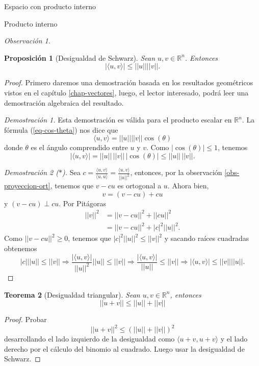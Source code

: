 \documentclass[a4paper,12pt,twoside,spanish,reqno]{amsbook}
\newtheorem{teorema}{Teorema}[section]
\newtheorem{proposicion}[teorema]{Proposici\'on}
\theoremstyle{definition}
\theoremstyle{remark}
\newtheorem{observacion}{Observaci\'on}[section]
\newcommand{\la}{\langle}
\newcommand{\ra}{\rangle}
\newcommand{\R}{\mathbb R}
\begin{document}
\begin{chapter}{Espacio con producto interno}
\begin{section}{Producto interno}
\begin{observacion}
		\end{observacion}
		
		\begin{proposicion}[Desigualdad de Schwarz] Sean $u, v\in \R^n$. Entonces 
			$$|\la u, v \ra| \le ||u||||v||.$$
		\end{proposicion}
		\begin{proof} Primero daremos una demostración basada en los resultados geométricos vistos en el capítulo \ref{chap-vectores}, luego,  el lector interesado, podrá leer una demostración algebraica del resultado. 
		
		\textit{Demostración 1.} Esta demostración es válida para el producto escalar en $\R^n$. La fórmula (\ref{eq-cos-theta}) nos dice que 
		\begin{equation*}
			\la u, v \ra = ||u||||v||\cos(\theta)
		\end{equation*}
		donde $\theta$ es el ángulo comprendido entre $u$ y $v$. Como $|\cos(\theta)| \le 1$,  tenemos
		\begin{equation*}
			|\la u, v \ra| = ||u||\,||v||\,|\cos(\theta)| \le  ||u||\,||v||.
		\end{equation*}
		
			
		\textit{Demostración 2 ($*$).}
			Sea $c = \displaystyle\frac{\la u,v\ra}{\la u,u\ra} = \frac{\la u,v\ra}{||u||^2}$, entonces, por la observación \ref{obs-proyeccion-ort}, tenemos que  $ v-cu$ es ortogonal a $u$. Ahora bien, 
			\begin{equation*}
				v = (v - cu) + cu   
			\end{equation*}
			y  $(v - cu) \perp cu$. Por Pitágoras
			\begin{align*}
			||v||^2 &= ||v-cu||^2 +||cu||^2  \\
			&=||v-cu||^2 +|c|^2||u||^2.
			\end{align*}
			Como $||v-cu||^2 \ge 0$, tenemos que $|c|^2||u||^2 \le 	||v||^2$ y sacando raíces cuadradas obtenemos
			$$
			|c|||u|| \le ||v|| \Rightarrow \frac{|\la u,v\ra|}{||u||^2}||u|| \le ||v|| \Rightarrow \frac{|\la u,v\ra|}{||u||}\le ||v|| \Rightarrow |\la u,v\ra|\le ||v||||u||.
			$$
		\end{proof}
		
		\begin{teorema}[Desigualdad triangular] Sean $u, v\in \R^n$, entonces 
			$$||u + v|| \le ||u|| + ||v||	$$
		\end{teorema}
		\begin{proof}
			Probar 
			$$
			||u + v||^2 \le (||u|| + ||v||)^2
			$$
			desarrollando  el lado izquierdo de la desigualdad  como $\la u+v, u+v \ra$ y el lado derecho por el cálculo del binomio al cuadrado. Luego usar la desigualdad de Schwarz.
		\end{proof}
		

\end{section}
\end{chapter}
\end{document}
